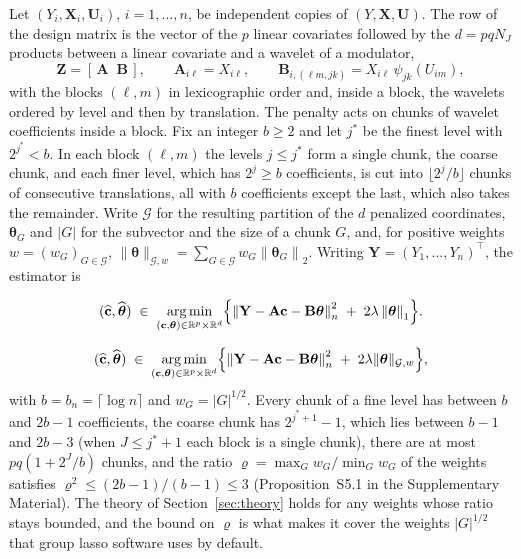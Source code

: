 \documentclass[12pt]{article} %
\theoremstyle{definition}
\theoremstyle{plain}
\newcommand{\R}{\mathbb{R}}
\newcommand{\T}{^{\top}}
\newcommand{\norm}[1]{\left\lVert #1 \right\rVert}
\newcommand{\normn}[1]{\left\lVert #1 \right\rVert_{n}}
\newcommand{\cv}{\ell}
\newcommand{\md}{m}
\newcommand{\lev}{j}
\newcommand{\tsl}{k}
\newcommand{\NJ}{N_{J}}
\newcommand{\bX}{\mathbf{X}}
\newcommand{\bU}{\mathbf{U}}
\newcommand{\bZ}{\mathbf{Z}}
\newcommand{\wav}[2]{\psi_{#1#2}}
\newcommand{\btheta}{\boldsymbol{\theta}}
\newcommand{\thetahat}{\widehat{\btheta}}
\newcommand{\bc}{\mathbf{c}}
\newcommand{\chat}{\widehat{\mathbf{c}}}
\newcommand{\pen}{\lambda}
\newcommand{\Amat}{\mathbf{A}}
\newcommand{\Bmat}{\mathbf{B}}
\newcommand{\bY}{\mathbf{Y}}
\newcommand{\Gcal}{\mathcal{G}}
\newcommand{\bn}{b_{n}}
\newcommand{\jst}{j^{*}}
\newcommand{\nGw}[1]{\lVert #1\rVert_{\mathcal{G},w}}
\newcommand{\removedk}{\par\noindent[removed in k = 4]\par}
\begin{document}
Let $(Y_i,\bX_i,\bU_i)$, $i = 1,\dots,n$, be independent copies of
$(Y,\bX,\bU)$. The row of the design matrix is the vector of the $p$ linear
covariates followed by the $d = pq\NJ$ products between a linear covariate and
a wavelet of a modulator,
\begin{equation}
  \label{eq:design}
  \bZ = [\,\Amat \;\; \Bmat\,], \qquad
  \Amat_{i\cv} = X_{i\cv}, \qquad
  \Bmat_{i,(\cv\md,\lev\tsl)} = X_{i\cv}\,\wav{\lev}{\tsl}(U_{i\md}),
\end{equation}
with the blocks $(\cv,\md)$ in lexicographic order and, inside a block, the
wavelets ordered by level and then by translation. \textcolor{colR1}{The penalty
acts on chunks of wavelet coefficients inside a block. Fix an integer
$b \ge 2$ and let $\jst$ be the finest level with $2^{\jst} < b$. In each block
$(\cv,\md)$ the levels $\lev \le \jst$ form a single chunk, the coarse chunk,
and each finer level, which has $2^{\lev} \ge b$ coefficients, is cut into
$\lfloor 2^{\lev}/b\rfloor$ chunks of consecutive translations, all with $b$
coefficients except the last, which also takes the remainder. Write $\Gcal$ for
the resulting partition of the $d$ penalized coordinates, $\btheta_{G}$ and
$|G|$ for the subvector and the size of a chunk $G$, and, for positive weights
$w = (w_{G})_{G\in\Gcal}$, $\nGw{\btheta} = \sum_{G\in\Gcal}w_{G}\norm{\btheta_{G}}_{2}$.}
Writing
$\bY = (Y_1,\dots,Y_n)\T$, the estimator is
{\color{gray}\removedk
\[
  (\chat,\thetahat) \;\in\; \mathop{\rm arg\,min}_{(\bc,\btheta)\in
  \R^{p}\times\R^{d}}
  \Bigl\{\normn{\bY - \Amat\bc - \Bmat\btheta}^{2}
  \;+\; 2\pen\norm{\btheta}_{1}\Bigr\} .
\]
}
{\color{colR1}
\begin{equation}
  \label{eq:estimator}
  (\chat,\thetahat) \;\in\; \mathop{\rm arg\,min}_{(\bc,\btheta)\in
  \R^{p}\times\R^{d}}
  \Bigl\{\normn{\bY - \Amat\bc - \Bmat\btheta}^{2}
  \;+\; 2\pen\nGw{\btheta}\Bigr\} ,
\end{equation}
with $b = \bn = \lceil\log n\rceil$ and $w_{G} = |G|^{1/2}$. Every chunk of a
fine level has between $b$ and $2b-1$ coefficients, the coarse chunk has
$2^{\jst+1}-1$, which lies between $b-1$ and $2b-3$ (when $J \le \jst+1$
each block is a single chunk), there are at most
$pq(1+2^{J}/b)$ chunks, and the ratio $\varrho = \max_{G}w_{G}/\min_{G}w_{G}$
of the weights satisfies $\varrho^{2} \le (2b-1)/(b-1) \le 3$
(Proposition~S5.1 in the Supplementary Material). The theory of
Section~\ref{sec:theory} holds for any weights whose ratio stays bounded, and
the bound on $\varrho$ is what makes it cover the weights $|G|^{1/2}$ that
group lasso software uses by default.}
\end{document}
